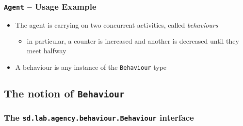 \documentclass[presentation]{beamer}\mode<presentation>{\usetheme{AMSCesenaPurpleAndGold}}
\begin{document}
\begin{frame}%
    \frametitle{\texttt{Agent} -- Usage Example}
    

    \vfill

    \begin{itemize}
        \item The agent is carrying on two \alert{concurrent activities}, called \emph{behaviours}
        \begin{itemize}
            \item in particular, a counter is increased and another is decreased until they meet halfway
        \end{itemize}

        \vfill

        \item A behaviour is any instance of the \texttt{\alert{Behaviour}} type
    \end{itemize}

\end{frame}

\subsection{The notion of \texttt{Behaviour}}

\begin{frame}%
    \frametitle{The \texttt{{\small{}sd.lab.agency.behaviour.}Behaviour} interface}

    

\end{frame}
\end{document}
